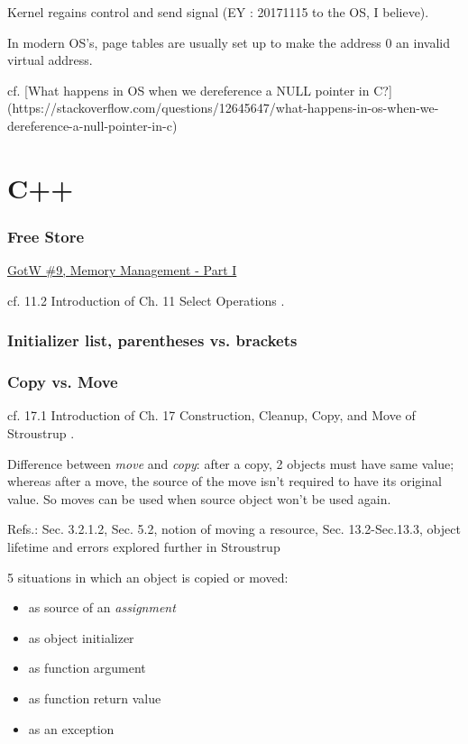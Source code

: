 \documentclass[10pt]{amsart}
\begin{document}
\begin{multicols*}{2}
Kernel regains control and send signal (EY : 20171115 to the OS, I believe).   

In modern OS's, page tables are usually set up to make the address 0 an invalid virtual address.  

cf. [What happens in OS when we dereference a NULL pointer in C?](https://stackoverflow.com/questions/12645647/what-happens-in-os-when-we-dereference-a-null-pointer-in-c)


\part{C++}  

\section{Free Store}  


\href{http://www.gotw.ca/gotw/009.htm}{GotW \#9, Memory Management - Part I}



cf. 11.2 Introduction of Ch. 11 Select Operations \cite{Stro2013}.  


\section{Initializer list, parentheses vs. brackets }

\section{Copy vs. Move}  
cf. 17.1 Introduction of Ch. 17 Construction, Cleanup, Copy, and Move of Stroustrup \cite{Stro2013}.  

Difference between \emph{move} and \emph{copy}: after a copy, 2 objects must have same value; whereas after a move, the source of the move isn't required to have its original value.  So moves can be used when source object won't be used again.  

Refs.: Sec. 3.2.1.2, Sec. 5.2, notion of moving a resource, Sec. 13.2-Sec.13.3, object lifetime and errors explored further in Stroustrup \cite{Stro2013}  


5 situations in which an object is copied or moved:   
\begin{itemize}
	\item as source of an \emph{assignment}
	\item as object initializer 
	\item as function argument
	\item as function return value
	\item as an exception  
\end{itemize}


\end{multicols*}
\end{document}
